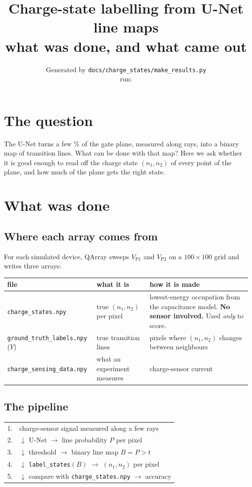 \documentclass[10pt,a4paper]{article}
\title{Charge-state labelling from U-Net line maps\\[2pt]
\large what was done, and what came out}
\author{\small Generated by \texttt{docs/charge\_states/make\_results.py}\\
\small run: \texttt{\vARun}}
\date{}
\begin{document}
\maketitle

\section{The question}
The U-Net turns a few \% of the gate plane, measured along rays, into a
binary map of transition lines.  What can be done with that map?  Here we
ask whether it is good enough to read off the charge state $(n_1,n_2)$ of
every point of the plane, and how much of the plane gets the right state.

\section{What was done}

\subsection*{Where each array comes from}
For each simulated device, QArray sweeps $V_\mathrm{P1}$ and $V_\mathrm{P2}$
on a $100\times100$ grid and writes three arrays:

\begin{center}
\begin{tabular}{p{4.2cm}p{4.3cm}p{6.2cm}}
\toprule
file & what it is & how it is made \\
\midrule
\texttt{charge\_states.npy} & true $(n_1,n_2)$ per pixel &
  lowest-energy occupation from the capacitance model.  \textbf{No sensor
  involved.}  Used \emph{only} to score. \\
\texttt{ground\_truth\_labels.npy} ($Y$) & true transition lines &
  pixels where $(n_1,n_2)$ changes between neighbours \\
\texttt{charge\_sensing\_data.npy} & what an experiment measures &
  charge-sensor current \\
\bottomrule
\end{tabular}
\end{center}

\subsection*{The pipeline}
\begin{center}
\begin{tabular}{rl}
1. & charge-sensor signal measured along a few rays \\
2. & $\downarrow$ U-Net $\to$ line probability $P$ per pixel \\
3. & $\downarrow$ threshold $\to$ binary line map $B = P > t$ \\
4. & $\downarrow$ \texttt{label\_states}$(B)$ $\to$ $(n_1,n_2)$ per pixel \\
5. & $\downarrow$ compare with \texttt{charge\_states.npy} $\to$ accuracy \\
\end{tabular}
\end{center}
\end{document}
